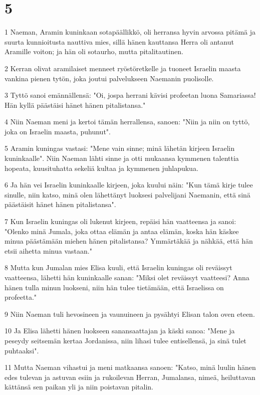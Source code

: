 \chapter{5}

\par 1 Naeman, Aramin kuninkaan sotapäällikkö, oli herransa hyvin arvossa pitämä ja suurta kunnioitusta nauttiva mies, sillä hänen kauttansa Herra oli antanut Aramille voiton; ja hän oli sotaurho, mutta pitalitautinen.
\par 2 Kerran olivat aramilaiset menneet ryöstöretkelle ja tuoneet Israelin maasta vankina pienen tytön, joka joutui palvelukseen Naemanin puolisolle.
\par 3 Tyttö sanoi emännällensä: "Oi, jospa herrani kävisi profeetan luona Samariassa! Hän kyllä päästäisi hänet hänen pitalistansa."
\par 4 Niin Naeman meni ja kertoi tämän herrallensa, sanoen: "Niin ja niin on tyttö, joka on Israelin maasta, puhunut".
\par 5 Aramin kuningas vastasi: "Mene vain sinne; minä lähetän kirjeen Israelin kuninkaalle". Niin Naeman lähti sinne ja otti mukaansa kymmenen talenttia hopeata, kuusituhatta sekeliä kultaa ja kymmenen juhlapukua.
\par 6 Ja hän vei Israelin kuninkaalle kirjeen, joka kuului näin: "Kun tämä kirje tulee sinulle, niin katso, minä olen lähettänyt luoksesi palvelijani Naemanin, että sinä päästäisit hänet hänen pitalistansa".
\par 7 Kun Israelin kuningas oli lukenut kirjeen, repäisi hän vaatteensa ja sanoi: "Olenko minä Jumala, joka ottaa elämän ja antaa elämän, koska hän käskee minua päästämään miehen hänen pitalistansa? Ymmärtäkää ja nähkää, että hän etsii aihetta minua vastaan."
\par 8 Mutta kun Jumalan mies Elisa kuuli, että Israelin kuningas oli reväissyt vaatteensa, lähetti hän kuninkaalle sanan: "Miksi olet reväissyt vaatteesi? Anna hänen tulla minun luokseni, niin hän tulee tietämään, että Israelissa on profeetta."
\par 9 Niin Naeman tuli hevosineen ja vaunuineen ja pysähtyi Elisan talon oven eteen.
\par 10 Ja Elisa lähetti hänen luokseen sanansaattajan ja käski sanoa: "Mene ja peseydy seitsemän kertaa Jordanissa, niin lihasi tulee entisellensä, ja sinä tulet puhtaaksi".
\par 11 Mutta Naeman vihastui ja meni matkaansa sanoen: "Katso, minä luulin hänen edes tulevan ja astuvan esiin ja rukoilevan Herran, Jumalansa, nimeä, heiluttavan kättänsä sen paikan yli ja niin poistavan pitalin.
